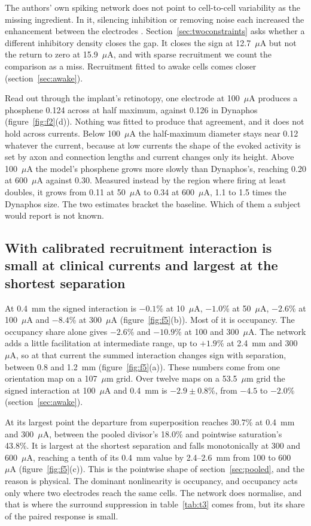 \documentclass[10pt,twocolumn]{article}
\newcommand{\um}{\ensuremath{\mu\text{m}}}
\newcommand{\uA}{\ensuremath{\mu\text{A}}}
\begin{document}
The authors' own spiking network does not point to cell-to-cell
variability as the missing ingredient. In it, silencing inhibition or
removing noise each increased the enhancement between the electrodes
\citep{kim2025}. Section~\ref{sec:twoconstraints} asks whether a different
inhibitory density closes the gap. It closes the sign at 12.7~\uA{} but
not the return to zero at 15.9~\uA, and with sparse recruitment we count
the comparison as a miss. Recruitment fitted to awake cells comes closer
(section~\ref{sec:awake}).

Read out through the implant's retinotopy, one electrode at 100~\uA{}
produces a phosphene 0.124\textdegree{} across at half maximum, against
0.126\textdegree{} in Dynaphos (figure~\ref{fig:f2}(d)). Nothing was
fitted to produce that agreement, and it does not hold across currents.
Below 100~\uA{} the half-maximum diameter stays near 0.12\textdegree{}
whatever the current, because at low currents the shape of the evoked
activity is set by axon and connection lengths and current changes only
its height. Above 100~\uA{} the model's phosphene grows more slowly than
Dynaphos's, reaching 0.20\textdegree{} at 600~\uA{} against
0.30\textdegree. Measured instead by the region where firing at least
doubles, it grows from 0.11\textdegree{} at 50~\uA{} to 0.34\textdegree{}
at 600~\uA, 1.1 to 1.5 times the Dynaphos size. The two estimates bracket
the baseline. Which of them a subject would report is not known.

\subsection{With calibrated recruitment interaction is small at clinical
currents and largest at the shortest separation}
\label{sec:magnitude}

At 0.4~mm the signed interaction is $-0.1$\% at 10~\uA, $-1.0$\% at
50~\uA, $-2.6$\% at 100~\uA{} and $-8.4$\% at 300~\uA{}
(figure~\ref{fig:f5}(b)). Most of it is occupancy. The occupancy share
alone gives $-2.6$\% and $-10.9$\% at 100 and 300~\uA. The network adds
a little facilitation at intermediate range, up to $+1.9$\% at 2.4~mm and
300~\uA, so at that current the summed interaction changes sign with
separation, between 0.8 and 1.2~mm (figure~\ref{fig:f5}(a)). These
numbers come from one orientation map on a 107~\um{} grid. Over twelve
maps on a 53.5~\um{} grid the signed interaction at 100~\uA{} and 0.4~mm
is $-2.9\pm0.8$\%, from $-4.5$ to $-2.0$\% (section~\ref{sec:awake}).

At its largest point the departure from superposition reaches 30.7\% at
0.4~mm and 300~\uA, between the pooled divisor's 18.0\% and pointwise
saturation's 43.8\%. It is largest at the shortest separation and falls
monotonically at 300 and 600~\uA, reaching a tenth of its 0.4~mm value by
2.4--2.6~mm from 100 to 600~\uA{} (figure~\ref{fig:f5}(c)). This is the
pointwise shape of section~\ref{sec:pooled}, and the reason is physical.
The dominant nonlinearity is occupancy, and occupancy acts only where two
electrodes reach the same cells. The network does normalise, and that is
where the surround suppression in table~\ref{tab:t3} comes from, but its
share of the paired response is small.
\end{document}
